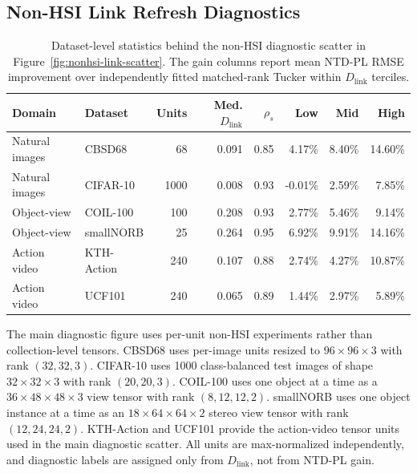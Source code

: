 \subsection{Non-HSI Link Refresh Diagnostics}
\label{app:nonhsi-link-diagnostics}

\begin{table}[ht]
  \centering
  \caption{Dataset-level statistics behind the non-HSI diagnostic scatter in
  Figure~\ref{fig:nonhsi-link-scatter}. The gain columns report mean NTD-PL
  RMSE improvement over independently fitted matched-rank Tucker within
  \(D_{\mathrm{link}}\) terciles.}
  \label{tab:nonhsi-link-diagnostic-stats}
  \small
  \renewcommand{\arraystretch}{1.08}
  \setlength{\tabcolsep}{4.2pt}
  \begin{tabular*}{\linewidth}{@{\extracolsep{\fill}}llrrrrrr@{}}
  \toprule
  Domain & Dataset & Units & Med. \(D_{\mathrm{link}}\) &
  \(\rho_s\) & Low & Mid & High \\
  \midrule
  Natural images & CBSD68 & 68 & 0.091 & 0.85 & 4.17\% & 8.40\% & 14.60\% \\
  Natural images & CIFAR-10 & 1000 & 0.008 & 0.93 & -0.01\% & 2.59\% & 7.85\% \\
  Object-view & COIL-100 & 100 & 0.208 & 0.93 & 2.77\% & 5.46\% & 9.14\% \\
  Object-view & smallNORB & 25 & 0.264 & 0.95 & 6.92\% & 9.91\% & 14.16\% \\
  Action video & KTH-Action & 240 & 0.107 & 0.88 & 2.74\% & 4.27\% & 10.87\% \\
  Action video & UCF101 & 240 & 0.065 & 0.89 & 1.44\% & 2.97\% & 5.89\% \\
  \bottomrule
  \end{tabular*}
\end{table}

The main diagnostic figure uses per-unit non-HSI experiments rather than
collection-level tensors. CBSD68 \citep{martin2001database}
uses per-image units resized to \(96\times96\times3\) with rank
\((32,32,3)\). CIFAR-10
\citep{krizhevsky2009learning} uses 1000 class-balanced test images of shape
\(32\times32\times3\) with rank \((20,20,3)\). COIL-100
\citep{nene1996coil100} uses one object at a time as a
\(36\times48\times48\times3\) view tensor with rank \((8,12,12,2)\).
smallNORB \citep{LeCun2004SmallNORB} uses one object instance at a time as an
\(18\times64\times64\times2\) stereo view tensor with rank
\((12,24,24,2)\). KTH-Action \citep{Schuldt2004KTHActions} and UCF101
\citep{Soomro2012UCF101} provide the action-video tensor units used in the
main diagnostic scatter. All units are max-normalized independently, and
diagnostic labels are assigned only from \(D_{\mathrm{link}}\), not from NTD-PL
gain.

